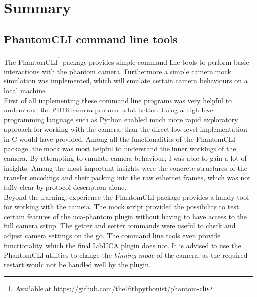 \section{Summary}

\subsection{PhantomCLI command line tools}

The PhantomCLI\footnote{Available at \url{https://github.com/the16thpythonist/phantom-cli}} package provides simple command line tools to perform basic interactions with the phantom camera. Furthermore a simple camera mock simulation was implemented, which will emulate certain camera behaviours on a local machine.\\
First of all implementing these command line programs was very helpful to understand the PH16 camera protocol a lot better. Using a high level programming language such as Python enabled much more rapid exploratory approach for working with the camera, than the direct low-level implementation in C would have provided. Among all the functionalities of the PhantomCLI package, the mock was most helpful to understand the inner workings of the camera. By attempting to emulate camera behaviour, I was able to gain a lot of insights. Among the most important insights were the concrete structures of the transfer encodings and their packing into the raw ethernet frames, which was not fully clear by protocol description alone.\\
Beyond the learning, experience the PhantomCLI package provides a handy tool for working with the camera. The mock script provided the possibility to test certain features of the uca-phantom plugin without having to have access to the full camera setup. The getter and setter commands were useful to check and adjust camera settings on the go. The command line tools even provide functionality, which the final LibUCA plugin does not. It is advised to use the PhantomCLI utilities to change the \textit{binning mode} of the camera, as the required restart would not be handled well by the plugin.

